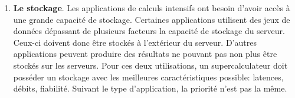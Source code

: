 \begin{enumerate}
             
           
                  
                    
            \item \textbf{Le stockage}. Les applications de calculs intensifs ont besoin d'avoir accès à une grande capacité de stockage. Certaines applications utilisent des jeux de données dépassant de plusieurs facteurs la capacité de stockage du serveur. Ceux-ci doivent donc être stockés à l'extérieur du serveur. D'autres applications peuvent produire des résultats ne pouvant pas non plus être stockés sur les serveurs. Pour ces deux utilisations, un supercalculateur doit posséder un stockage avec les meilleures caractéristiques possible: latences, débits, fiabilité. Suivant le type d'application, la priorité n'est pas la même.
            
            
                   

\end{enumerate}
